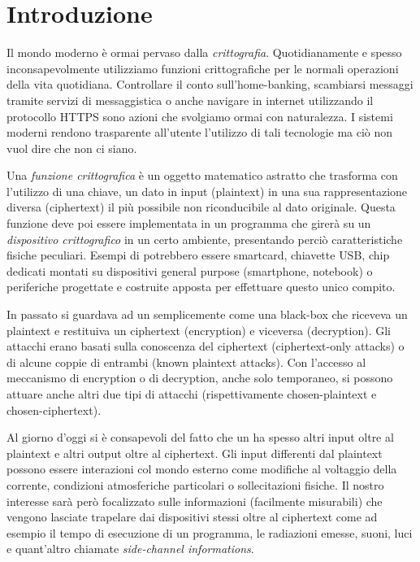 \chapter*{Introduzione}
	Il mondo moderno è ormai pervaso dalla \emph{crittografia}. Quotidianamente e spesso inconsapevolmente utilizziamo funzioni crittografiche per le normali operazioni della vita quotidiana. Controllare il conto sull'home-banking, scambiarsi messaggi tramite servizi di messaggistica o anche navigare in internet utilizzando il protocollo \acs{HTTPS} sono azioni che svolgiamo ormai con naturalezza. I sistemi moderni rendono trasparente all'utente l'utilizzo di tali tecnologie ma ciò non vuol dire che non ci siano.
	
	Una \emph{funzione crittografica} è un oggetto matematico astratto che trasforma con l'utilizzo di una chiave, un dato in input (plaintext) in una sua rappresentazione diversa (ciphertext) il più possibile non riconducibile al dato originale. Questa funzione deve poi essere implementata in un programma che girerà su un \emph{dispositivo crittografico} in un certo ambiente, presentando perciò caratteristiche fisiche peculiari. Esempi di \dispp potrebbero essere smartcard, chiavette \acs{USB}, chip dedicati montati su dispositivi general purpose (smartphone, notebook) o periferiche progettate e costruite apposta per effettuare questo unico compito.
	
	In passato si guardava ad un \disps semplicemente come una black-box che riceveva un plaintext e restituiva un ciphertext (encryption) e viceversa (decryption). Gli attacchi erano basati sulla conoscenza del ciphertext (ciphertext-only attacks) o di alcune coppie di entrambi (known plaintext attacks). Con l'accesso al meccanismo di encryption o di decryption, anche solo temporaneo, si possono attuare anche altri due tipi di attacchi (rispettivamente chosen-plaintext e chosen-ciphertext)\cite{dispenseCS}.
	
	Al giorno d'oggi si è consapevoli del fatto che un \disps ha spesso altri input oltre al plaintext e altri output oltre al ciphertext. Gli input differenti dal plaintext possono essere interazioni col mondo esterno come modifiche al voltaggio della corrente, condizioni atmosferiche particolari o sollecitazioni fisiche. Il nostro interesse sarà però focalizzato sulle informazioni (facilmente misurabili) che vengono lasciate trapelare dai dispositivi stessi oltre al ciphertext come ad esempio il tempo di esecuzione di un programma, le radiazioni emesse, suoni, luci e quant'altro chiamate \emph{side-channel informations}.
	 
